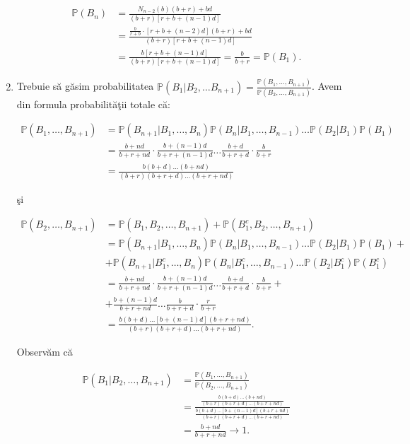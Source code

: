 \documentclass[]{article}
\def\PP{{\mathbb P}}
\begin{document}
\begin{enumerate}
  \begin{align*}
  \PP(B_n)&=\frac{N_{n-2}(b)(b+r)+bd}{(b+r)[r+b+(n-1)d]}\\
  &=\frac{\frac{b}{r+b}\cdot[r+b+(n-2)d](b+r)+bd}{(b+r)[r+b+(n-1)d]}\\
  &=\frac{b[r+b+(n-1)d]}{(b+r)[r+b+(n-1)d]}=\frac{b}{b+r}=\PP(B_1).
  \end{align*}
\item
  Trebuie s\u a g\u asim probabilitatea
  \(\PP(B_1|B_2,\dots B_{n+1})=\frac{\PP(B_1,\dots,B_{n+1})}{\PP(B_2,\dots,B_{n+1})}\).
  Avem din formula probabilit\u a\c tii totale c\u a:

  \begin{align*}
  \PP(B_1,\dots,B_{n+1})&=\PP(B_{n+1}|B_1,\dots,B_n)\PP(B_n|B_1,\dots,B_{n-1})\dots\PP(B_2|B_1)\PP(B_1)\\
  &=\frac{b+nd}{b+r+nd}\cdot\frac{b+(n-1)d}{b+r+(n-1)d}\dots\frac{b+d}{b+r+d}\cdot\frac{b}{b+r}\\
  &=\frac{b(b+d)\dots(b+nd)}{(b+r)(b+r+d)\dots(b+r+nd)}
  \end{align*}

  \c si

  \begin{align*}
  \PP(B_2,\dots,B_{n+1})&=\PP(B_1,B_2,\dots,B_{n+1})+\PP(B_1^c,B_2,\dots,B_{n+1})\\
  &=\PP(B_{n+1}|B_1,\dots,B_n)\PP(B_n|B_1,\dots,B_{n-1})\dots\PP(B_2|B_1)\PP(B_1)+\\
  &+\PP(B_{n+1}|B_1^c,\dots,B_n)\PP(B_n|B_1^c,\dots,B_{n-1})\dots\PP(B_2|B_1^c)\PP(B_1^c)\\
  &=\frac{b+nd}{b+r+nd}\cdot\frac{b+(n-1)d}{b+r+(n-1)d}\dots\frac{b+d}{b+r+d}\cdot\frac{b}{b+r}+\\
  &+\frac{b+(n-1)d}{b+r+nd}\dots\frac{b}{b+r+d}\cdot\frac{r}{b+r}\\
  &=\frac{b(b+d)\dots[b+(n-1)d](b+r+nd)}{(b+r)(b+r+d)\dots(b+r+nd)}.
  \end{align*}

  Observ\u am c\u a

  \begin{align*}
  \PP(B_1|B_2,\dots,B_{n+1})&=\frac{\PP(B_1,\dots,B_{n+1})}{\PP(B_2,\dots,B_{n+1})}\\
  &=\frac{\frac{b(b+d)\dots(b+nd)}{(b+r)(b+r+d)\dots(b+r+nd)}}{\frac{b(b+d)\dots[b+(n-1)d](b+r+nd)}{(b+r)(b+r+d)\dots(b+r+nd)}}\\
  &=\frac{b+nd}{b+r+nd}\to 1.
  \end{align*}
\end{enumerate}
\end{document}
